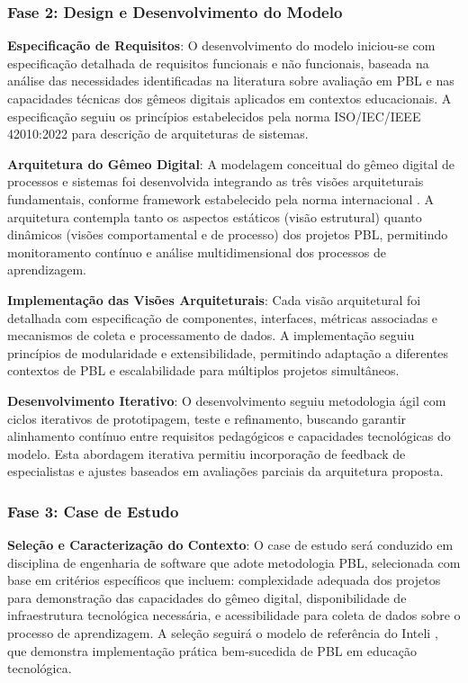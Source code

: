 \documentclass[12pt, a4paper, oneside, brazilian]{abntex2}
\begin{document}
\subsubsection{Fase 2: Design e Desenvolvimento do Modelo}

\textbf{Especificação de Requisitos}: O desenvolvimento do modelo iniciou-se com especificação detalhada de requisitos funcionais e não funcionais, baseada na análise das necessidades identificadas na literatura sobre avaliação em PBL \cite{guo2020, lavado2024} e nas capacidades técnicas dos gêmeos digitais aplicados em contextos educacionais. A especificação seguiu os princípios estabelecidos pela norma ISO/IEC/IEEE 42010:2022 \cite{iso42010} para descrição de arquiteturas de sistemas.

\textbf{Arquitetura do Gêmeo Digital}: A modelagem conceitual do gêmeo digital de processos e sistemas foi desenvolvida integrando as três visões arquiteturais fundamentais, conforme framework estabelecido pela norma internacional \cite{iso42010}. A arquitetura contempla tanto os aspectos estáticos (visão estrutural) quanto dinâmicos (visões comportamental e de processo) dos projetos PBL, permitindo monitoramento contínuo e análise multidimensional dos processos de aprendizagem.

\textbf{Implementação das Visões Arquiteturais}: Cada visão arquitetural foi detalhada com especificação de componentes, interfaces, métricas associadas e mecanismos de coleta e processamento de dados. A implementação seguiu princípios de modularidade e extensibilidade, permitindo adaptação a diferentes contextos de PBL e escalabilidade para múltiplos projetos simultâneos.

\textbf{Desenvolvimento Iterativo}: O desenvolvimento seguiu metodologia ágil com ciclos iterativos de prototipagem, teste e refinamento, buscando garantir alinhamento contínuo entre requisitos pedagógicos e capacidades tecnológicas do modelo. Esta abordagem iterativa permitiu incorporação de feedback de especialistas e ajustes baseados em avaliações parciais da arquitetura proposta.

\subsubsection{Fase 3: Case de Estudo}

\textbf{Seleção e Caracterização do Contexto}: O case de estudo será conduzido em disciplina de engenharia de software que adote metodologia PBL, selecionada com base em critérios específicos que incluem: complexidade adequada dos projetos para demonstração das capacidades do gêmeo digital, disponibilidade de infraestrutura tecnológica necessária, e acessibilidade para coleta de dados sobre o processo de aprendizagem. A seleção seguirá o modelo de referência do Inteli \cite{inteli2024}, que demonstra implementação prática bem-sucedida de PBL em educação tecnológica.
\end{document}
